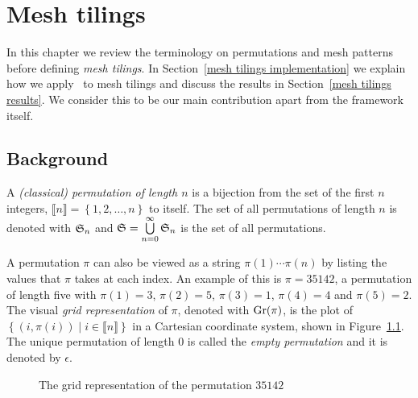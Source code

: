 \chapter{Mesh tilings\label{mesh tilings chapter}}

In this chapter we review the terminology on permutations and mesh patterns 
before defining \emph{mesh tilings}. In Section~\ref{mesh tilings 
implementation} we explain how we apply \CombCov\ to mesh tilings and discuss 
the results in Section~\ref{mesh tilings results}. We consider this to be our
main contribution apart from the framework itself.

\section{Background\label{mesh tilings background}}

\begin{definition}
  A \emph{(classical) permutation of length $n$} is a bijection from the set of 
  the first $n$ integers, $\llbracket n \rrbracket = \left\{ 1, 2, \ldots, n 
  \right\}$ to itself. The set of all permutations of length $n$ is denoted with 
  $\S_n$ and $\S = \bigcup\limits_{n=0}^{\infty}\S_n$ is the set of all 
  permutations.
\end{definition}

A permutation $\pi$ can also be viewed as a string $\pi(1)\cdots\pi(n)$ by listing 
the values that $\pi$ takes at each index. An example of this is $\pi = 35142$, a 
permutation of length five with $\pi(1) = 3$, $\pi(2) = 5$, $\pi(3) = 1$, 
$\pi(4) = 4$ and $\pi(5) = 2$. The visual \emph{grid representation} of $\pi$, 
denoted with $\Gr{\pi}$, is the plot of $\left\{ (i, \pi(i)) \mid i \in 
\llbracket n \rrbracket \right\}$ in a Cartesian coordinate system, shown in 
Figure~\ref{figure: Gr(35142)}. The unique permutation of length 0 is called the 
\emph{empty permutation} and it is denoted by $\epsilon$.

\begin{figure}[htbp]
  \center
  \caption{The grid representation of the permutation $35142$}
  \label{figure: Gr(35142)}
\end{figure}

